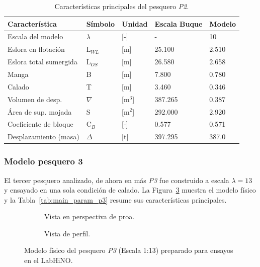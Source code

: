 \begin{table}[htbp]
\centering
\caption{Características principales del pesquero \textit{P2}.}
\label{tab:main_param_p2}
\begin{tabularx}{\textwidth}{lllll}
\toprule
\textbf{Característica}&\textbf{Símbolo}&\textbf{Unidad} & \textbf{Escala Buque} & \textbf{Modelo}\\
\midrule
Escala del modelo & $\lambda$ & {[}-{]} & - & 10 \\
Eslora en flotación& L$_{WL}$ & {[}m{]} & 25.100 & 2.510 \\
Eslora total sumergida & L$_{OS}$ & {[}m{]} & 26.580 & 2.658 \\
Manga & B & {[}m{]} & 7.800 & 0.780 \\
Calado & T & {[}m{]} & 3.460 & 0.346 \\
Volumen de desp. & $\nabla$ & {[}m$^3${]} & 387.265 & 0.387 \\
Área de sup. mojada & S & {[}m$^2${]} & 292.000 & 2.920 \\
Coeficiente de bloque & C$_B$ & {[}-{]} & 0.577 & 0.571 \\
Desplazamiento (masa) & $\Delta$ & {[}t{]} & 397.295 & 387.0 \\
\bottomrule
\end{tabularx}
\end{table}

\subsubsection{Modelo pesquero 3}
El tercer pesquero analizado, de ahora en más \textit{P3} fue construido a escala $\lambda = 13$ y ensayado en una sola condición de calado. La Figura~\ref{fig:model_jpa} muestra el modelo físico y la Tabla~\ref{tab:main_param_p3} resume sus características principales.

\begin{figure}[htbp]
    \centering
    \begin{subfigure}{\textwidth}
        \centering
        \caption{Vista en perspectiva de proa.}
        \label{fig:jpa_pers}
    \end{subfigure}

    \vspace{0.5em}
    \begin{subfigure}{\textwidth}
        \centering
        \caption{Vista de perfil.}
        \label{fig:jpa_side}
    \end{subfigure}
    \caption{Modelo físico del pesquero \textit{P3} (Escala 1:13) preparado para ensayos en el LabHiNO.}
    \label{fig:model_jpa}
\end{figure}

